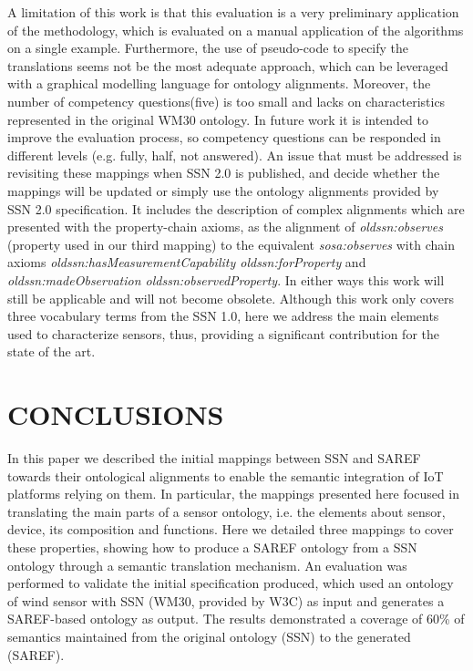 \documentclass{sig-alternate-05-2015}
\begin{document}
A limitation of this work is that this evaluation is a very preliminary application of the methodology, which is evaluated on a manual application of the algorithms on a single example. Furthermore, the use of pseudo-code to specify the translations seems not be the most adequate approach, which can be leveraged with a graphical modelling language for ontology alignments. Moreover, the number of competency questions(five) is too small and lacks on characteristics represented in the original WM30 ontology. In future work it is intended to improve the evaluation process, so competency questions can be responded in different levels (e.g. fully, half, not answered). An issue that must be addressed is revisiting these mappings when SSN 2.0 is published, and decide whether the mappings will be updated or simply use the ontology alignments provided by SSN 2.0 specification. It includes the description of complex alignments which are presented with the property-chain axioms, as the alignment of \textit{oldssn:observes} (property used in our third mapping) to the equivalent \textit{sosa:observes} with chain axioms \textit{oldssn:hasMeasurementCapability oldssn:forProperty} and \textit{oldssn:madeObservation oldssn:observedProperty}. In either ways this work will still be applicable and will not become obsolete. Although this work only covers three vocabulary terms from the SSN 1.0, here we address the main elements used to characterize sensors, thus, providing a significant contribution for the state of the art.  


\section{CONCLUSIONS}

In this paper we described the initial mappings between SSN and SAREF towards their ontological alignments to enable the semantic integration of IoT platforms relying on them. In particular, the mappings presented here focused in translating the main parts of a sensor ontology, i.e. the elements about sensor, device, its composition and functions. Here we detailed three mappings to cover these properties, showing how to produce a SAREF ontology from a SSN ontology through a semantic translation mechanism. An evaluation was performed to validate the initial specification produced, which used an ontology of wind sensor with SSN (WM30, provided by W3C) as input and generates a SAREF-based ontology as output. The results demonstrated a coverage of 60\% of semantics maintained from the original ontology (SSN) to the generated (SAREF). 
\end{document}

